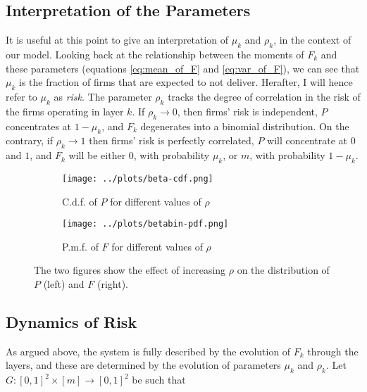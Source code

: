 \documentclass[../../main.tex]{subfiles}
\begin{document}
\subsection{Interpretation of the Parameters}


It is useful at this point to give an interpretation of $\mu_k$ and $\rho_k$, in the context of our model. Looking back at the relationship between the moments of $F_k$ and these parameters (equations \ref{eq:mean_of_F} and \ref{eq:var_of_F}), we can see that $\mu_k$ is the fraction of firms that are expected to not deliver. Herafter, I will hence refer to $\mu_k$ as \textit{risk}. The parameter $\rho_k$ tracks the degree of correlation in the risk of the firms operating in layer $k$. If $\rho_k \to 0$, then firms' risk is independent, $P$ concentrates at $1 - \mu_k$, and $F_k$ degenerates into a binomial distribution. On the contrary, if $\rho_k \rightarrow 1$ then firms' risk is perfectly correlated, $P$ will concentrate at $0$ and $1$, and $F_k$ will be either 0, with probability $\mu_k$, or $m$, with probability $1 - \mu_k$.



\begin{figure}[H]
  \centering
  \begin{subfigure}{.5\textwidth}
    \centering
    \texttt{[image: ../plots/beta-cdf.png]}
    \caption{C.d.f. of $P$ for different values of $\rho$}
    \label{fig:distribution-illustration:beta}
  \end{subfigure}%
  \begin{subfigure}{.5\textwidth}
    \centering
    \texttt{[image: ../plots/betabin-pdf.png]} 
    \caption{P.m.f. of $F$ for different values of $\rho$}
    \label{fig:distribution-illustration:beta-binomial}
  \end{subfigure}%
  \caption{The two figures show the effect of increasing $\rho$ on the distribution of $P$ (left) and $F$ (right).}
  \label{fig:distribution-illustration}
\end{figure}

\subsection{Dynamics of Risk}


As argued above, the system is fully described by the evolution of $F_k$ through the layers, and these are determined by the evolution of parameters $\mu_k$ and $\rho_k$. Let $G: [0, 1]^2 \times [m] \to [0, 1]^2$ be such that
\end{document}
